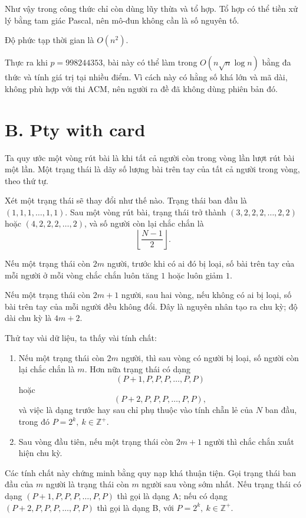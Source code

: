\documentclass[11pt]{article}
\begin{document}
Như vậy trong công thức chỉ còn dùng lũy thừa và tổ hợp. Tổ hợp có thể tiền
xử lý bằng tam giác Pascal, nên mô-đun không cần là số nguyên tố.

Độ phức tạp thời gian là $O(n^2)$.

Thực ra khi $p=998244353$, bài này có thể làm trong
$O(n\sqrt n\log n)$ bằng đa thức và tính giá trị tại nhiều điểm. Vì cách này
có hằng số khá lớn và mã dài, không phù hợp với thi ACM, nên người ra đề đã
không dùng phiên bản đó.

\section{B. Pty with card}

Ta quy ước một vòng rút bài là khi tất cả người còn trong vòng lần lượt rút
bài một lần. Một trạng thái là dãy số lượng bài trên tay của tất cả người
trong vòng, theo thứ tự.

Xét một trạng thái sẽ thay đổi như thế nào. Trạng thái ban đầu là
$(1,1,1,\ldots,1,1)$. Sau một vòng rút bài, trạng thái trở thành
$(3,2,2,2,\ldots,2,2)$ hoặc $(4,2,2,2,\ldots,2)$, và số người còn lại chắc
chắn là
\[
  \left\lfloor \frac{N-1}{2}\right\rfloor .
\]

Nếu một trạng thái còn $2m$ người, trước khi có ai đó bị loại, số bài trên
tay của mỗi người ở mỗi vòng chắc chắn luôn tăng $1$ hoặc luôn giảm $1$.

Nếu một trạng thái còn $2m+1$ người, sau hai vòng, nếu không có ai bị loại,
số bài trên tay của mỗi người đều không đổi. Đây là nguyên nhân tạo ra chu
kỳ; độ dài chu kỳ là $4m+2$.

Thử tay vài dữ liệu, ta thấy vài tính chất:
\begin{enumerate}
  \item Nếu một trạng thái còn $2m$ người, thì sau vòng có người bị loại, số
  người còn lại chắc chắn là $m$. Hơn nữa trạng thái có dạng
  \[
    (P+1,P,P,P,\ldots,P,P)
  \]
  hoặc
  \[
    (P+2,P,P,P,\ldots,P,P),
  \]
  và việc là dạng trước hay sau chỉ phụ thuộc vào tính chẵn lẻ của $N$ ban
  đầu, trong đó $P=2^k,\ k\in\mathbb{Z}^+$.
  \item Sau vòng đầu tiên, nếu một trạng thái còn $2m+1$ người thì chắc chắn
  xuất hiện chu kỳ.
\end{enumerate}

Các tính chất này chứng minh bằng quy nạp khá thuận tiện. Gọi trạng thái ban
đầu của $m$ người là trạng thái còn $m$ người sau vòng sớm nhất. Nếu trạng
thái có dạng $(P+1,P,P,P,\ldots,P,P)$ thì gọi là dạng A; nếu có dạng
$(P+2,P,P,P,\ldots,P,P)$ thì gọi là dạng B, với
$P=2^k,\ k\in\mathbb{Z}^+$.
\end{document}
